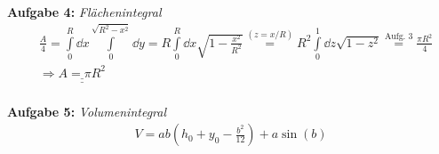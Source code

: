 \textbf{Aufgabe 4: } \emph{Flächenintegral}
\begin{align*}
&\frac{A}{4}=\int\limits_0^R \dd x \int\limits_0^{\sqrt{R^2-x^2}}\dd y=R\int\limits_0^R\dd x\sqrt{1-\frac{x^2}{R^2}}\stackrel{(z=x/R)}{=}R^2\int\limits_0^1 \dd z\sqrt{1-z^2}\stackrel{\text{Aufg. 3}}{=}\frac{\pi R^2}{4}\\[1ex]
&\Rightarrow \underline{\underline{A=\pi R^2}}
\end{align*}\\[0.2cm]
%
\textbf{Aufgabe 5: } \emph{Volumenintegral}
\begin{align*}
V=ab\left(h_0+y_0-\frac{b^2}{12}\right)+a\sin(b)
\end{align*}